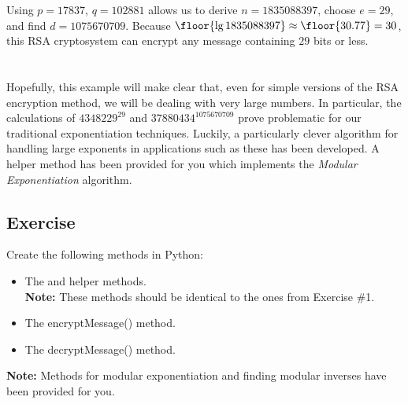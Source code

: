			Using $p = 17837$, $q = 102881$ allows us to derive $n = 1835088397$, choose $e = 29$, and find $d = 1075670709$. Because $\floor{\lg 1835088397} \approx \floor{30.77} = 30$, this RSA cryptosystem can encrypt any message containing $29$ bits or less.\\[\baselineskip]
			\ \\[9pt]
			\ \\[\baselineskip]
			Hopefully, this example will make clear that, even for simple versions of the RSA encryption method, we will be dealing with very large numbers. In particular, the calculations of $4348229^{29}$ and $37880434^{1075670709}$ prove problematic for our traditional exponentiation techniques. Luckily, a particularly clever algorithm for handling large exponents in applications such as these has been developed. A helper method has been provided for you which implements the \emph{Modular Exponentiation} algorithm.

		\subsection{Exercise}
				Create the following methods in Python:
				\begin{itemize}
					\item The  and  helper methods.\\
					\textbf{Note:} These methods should be identical to the ones from Exercise \#1.
					\item The encryptMessage() method.
					\item The decryptMessage() method.
				\end{itemize}
				\textbf{Note:} Methods for modular exponentiation and finding modular inverses have been provided for you.

